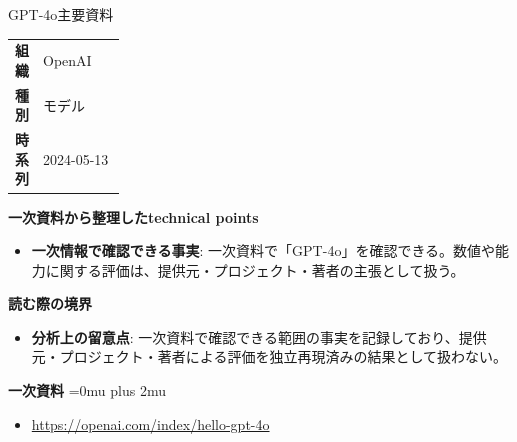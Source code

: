 \begin{technicalnote}{GPT-4o}{主要資料}
\begingroup
\begin{tabularx}{\linewidth}{@{}>{\bfseries}p{0.22\linewidth}X@{}}
組織 & OpenAI \\
種別 & モデル \\
時系列 & 2024-05-13 \\
\end{tabularx}
\smallskip
{\bfseries 一次資料から整理したtechnical points}
\begin{itemize}[leftmargin=1.5em,itemsep=0.35em]
\item \textbf{一次情報で確認できる事実}: 一次資料で「GPT-4o」を確認できる。数値や能力に関する評価は、提供元・プロジェクト・著者の主張として扱う。
\end{itemize}
\begin{minipage}{\linewidth}
{\bfseries 読む際の境界}
\begin{itemize}[leftmargin=1.5em,itemsep=0.35em]
\item \textbf{分析上の留意点}: 一次資料で確認できる範囲の事実を記録しており、提供元・プロジェクト・著者による評価を独立再現済みの結果として扱わない。
\end{itemize}
\begin{samepage}
{\bfseries 一次資料}
\begingroup\sloppy
\Urlmuskip=0mu plus 2mu\relax
\begin{itemize}[leftmargin=1.5em,itemsep=0.25em]
\item {\scriptsize\url{https://openai.com/index/hello-gpt-4o}}
\end{itemize}
\endgroup
\end{samepage}
\end{minipage}
\endgroup
\end{technicalnote}
\medskip

